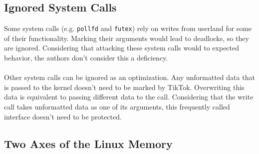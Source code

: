 \subsection{Ignored System Calls}
\label{subsec:ignoredcalls}

Some system calls (e.g. \texttt{pollfd} and \texttt{futex}) rely on writes from userland for some of their functionality. Marking their arguments
would lead to deadlocks, so they are ignored. Considering that attacking these system calls would to expected behavior, the authors
don't consider this a deficiency.
\\
\\
Other system calls can be ignored as an optimization. Any unformatted data that is passed to the kernel doesn't need
to be marked by TikTok. Overwriting this data is equivalent to passing different data to the call. Considering
that the write call takes unformatted data as one of its arguments, this frequently called interface doesn't need to
be protected.

\subsection{Two Axes of the Linux Memory}

